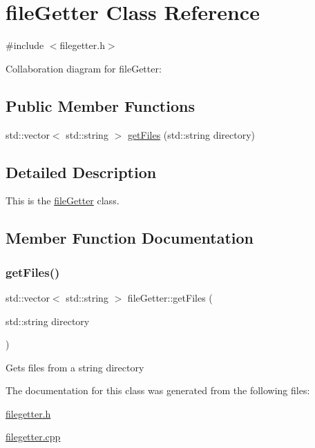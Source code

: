 \hypertarget{classfileGetter}{}\section{file\+Getter Class Reference}
\label{classfileGetter}


{\ttfamily \#include $<$filegetter.\+h$>$}



Collaboration diagram for file\+Getter\+:
\subsection*{Public Member Functions}
\begin{DoxyCompactItemize}
\item 
std\+::vector$<$ std\+::string $>$ \hyperlink{classfileGetter_a2ab6fdcd4ae9377b24f51c35497dfd49}{get\+Files} (std\+::string directory)
\end{DoxyCompactItemize}


\subsection{Detailed Description}
This is the \hyperlink{classfileGetter}{file\+Getter} class. 

\subsection{Member Function Documentation}
\mbox{\label{classfileGetter_a2ab6fdcd4ae9377b24f51c35497dfd49}} 
\subsubsection{\texorpdfstring{get\+Files()}{getFiles()}}
{\footnotesize\ttfamily std\+::vector$<$ std\+::string $>$ file\+Getter\+::get\+Files (\begin{DoxyParamCaption}\item[{std\+::string}]{directory }\end{DoxyParamCaption})}

Gets files from a string directory 

The documentation for this class was generated from the following files\+:\begin{DoxyCompactItemize}
\item 
\hyperlink{filegetter_8h}{filegetter.\+h}\item 
\hyperlink{filegetter_8cpp}{filegetter.\+cpp}\end{DoxyCompactItemize}
